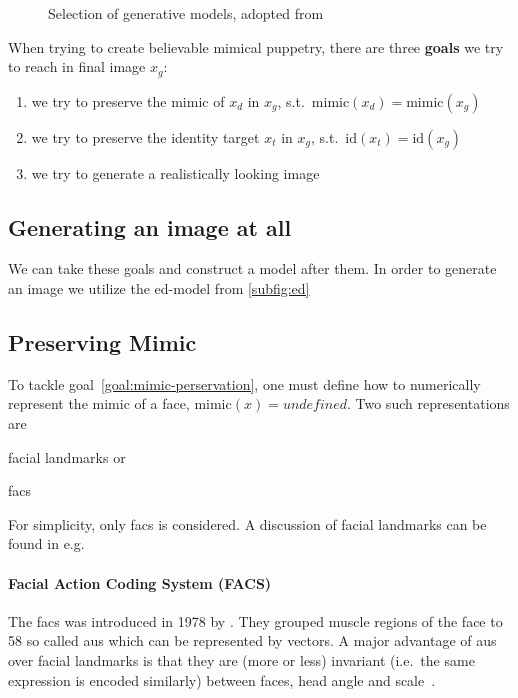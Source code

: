 \begin{figure}[h]
    \centering
    \caption{Selection of generative models, adopted from~\cite{Mirsky.2020}}\label{fig:generative-models}
\end{figure}

When trying to create believable mimical puppetry, there are three \textbf{goals}
we try to reach in final image \(x_g\):
\begin{enumerate}[1.)]
    \item we try to preserve the mimic of \(x_d\) in \(x_g\), s.t.\ \(\text{mimic}(x_d)=\text{mimic}(x_g)\)\label{goal:mimic-perservation}
    \item we try to preserve the identity target \(x_t\) in \(x_g\), s.t.\ \(\text{id}(x_t)=\text{id}(x_g)\)\label{goal:preserve-identity}
    \item we try to generate a realistically looking image\label{goal:increase-realism}
\end{enumerate}
\subsection{Generating an image at all}
We can take these goals and construct a model after them. In order to generate
an image we utilize the \gls{ed}-model from \cref{subfig:ed}

\subsection{Preserving Mimic}
To tackle goal~\ref{goal:mimic-perservation}, one must define how to
numerically represent the mimic of a face, \(\text{mimic}(x)=\textit{undefined}\).
Two such representations are
\begin{enumerate*}[a.)]
    \item facial landmarks or
    \item \gls{facs}
\end{enumerate*}
For simplicity, only \gls{facs} is considered. A discussion of facial landmarks
can be found in e.g.\ \cite{Ha.2020}

\paragraph*{Facial Action Coding System (FACS)}
The \gls{facs} was introduced in 1978 by \textcite{Ekman.1978}. They grouped
muscle regions of the face to 58 so called \glspl{au} which can be represented
by vectors. A major advantage of \glspl{au} over facial landmarks is that they
are (more or less) invariant (i.e.\ the same expression is encoded similarly)
between faces, head angle and scale~\cite{Pham.2018}.


